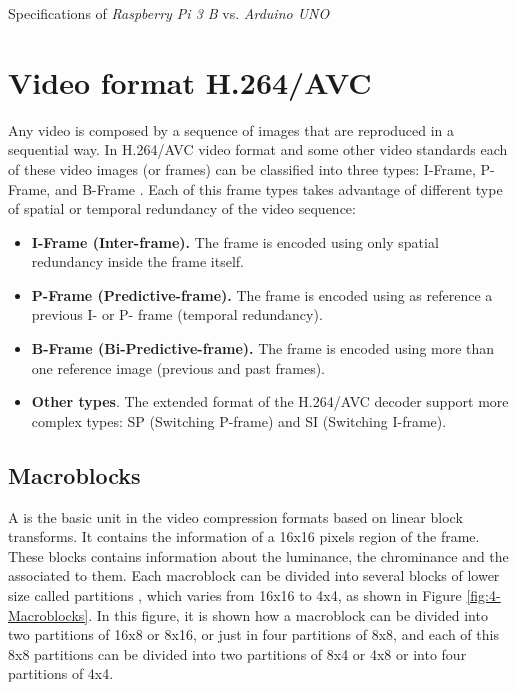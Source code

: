 \begin{table}[!h]
	\centering
	{\small
		
	}
	\caption{Specifications of \textit{Raspberry Pi 3 B} vs. \textit{Arduino UNO}}
	\label{tab:raspberry-vs-arduino}
\end{table}


\section{Video format H.264/AVC}
\label{subsect:H.264}
Any video is composed by a sequence of images that are reproduced in a sequential way. In H.264/AVC video format and some other video standards each of these video images (or frames) can be classified into three types: I-Frame, P-Frame, and B-Frame \cite{SC11}. Each of this frame types takes advantage of different type of spatial or temporal redundancy of the video sequence: 
\begin{itemize}
	\item \textbf{I-Frame (Inter-frame).} The frame is encoded using only spatial redundancy inside the frame itself.
	\item \textbf{P-Frame (Predictive-frame).} The frame is encoded using as reference a previous I- or P- frame (temporal redundancy).
	\item \textbf{B-Frame (Bi-Predictive-frame).} The frame is encoded using more than one reference image (previous and past frames).
	\item \textbf{Other types}. The extended format of the H.264/AVC decoder support more complex types: SP (Switching P-frame) and SI (Switching I-frame).
\end{itemize}

\subsection{Macroblocks}
\label{subsect:Macroblocks}
A  is the basic unit in the video compression formats based on linear block transforms. It contains the information of a 16x16 pixels region of the frame. These blocks contains information about the luminance, the chrominance and the  associated to them. Each macroblock can be divided into several blocks of lower size called partitions \cite{Gir14}, which varies from 16x16 to 4x4, as shown in Figure \ref{fig:4-Macroblocks}. In this figure, it is shown how a macroblock can be divided into two partitions of 16x8 or 8x16, or just in four partitions of 8x8, and each of this 8x8 partitions can be divided into two partitions of 8x4 or 4x8 or into four partitions of 4x4.

